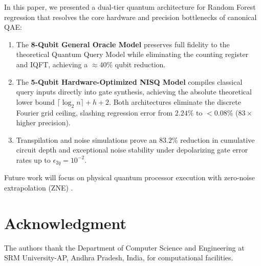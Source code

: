 \documentclass[conference]{IEEEtran}
\begin{document}
In this paper, we presented a dual-tier quantum architecture for Random Forest regression that resolves the core hardware and precision bottlenecks of canonical QAE:
\begin{enumerate}
    \item The \textbf{8-Qubit General Oracle Model} preserves full fidelity to the theoretical Quantum Query Model while eliminating the counting register and IQFT, achieving a $\approx 40\%$ qubit reduction.
    \item The \textbf{5-Qubit Hardware-Optimized NISQ Model} compiles classical query inputs directly into gate synthesis, achieving the absolute theoretical lower bound $\lceil\log_2 n\rceil + h + 2$. Both architectures eliminate the discrete Fourier grid ceiling, slashing regression error from $2.24\%$ to $< 0.08\%$ ($83\times$ higher precision).
    \item Transpilation and noise simulations prove an $83.2\%$ reduction in cumulative circuit depth and exceptional noise stability under depolarizing gate error rates up to $\epsilon_{2q} = 10^{-2}$.
\end{enumerate}
Future work will focus on physical quantum processor execution with zero-noise extrapolation (ZNE) \cite{temme2017error,endo2018practical}.

\section*{Acknowledgment}
The authors thank the Department of Computer Science and Engineering at SRM University-AP, Andhra Pradesh, India, for computational facilities.

\balance


\end{document}
